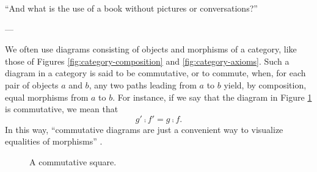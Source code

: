 \epigraph{
  ``And what is the use of a book without pictures or conversations?''
}{---\textcite[13]{carroll-2004}}

\begin{definition}
  \label{def:commutative-diagram}


  We often use diagrams consisting of objects and morphisms of a
  category, like those of Figures \ref{fig:category-composition} and
  \ref{fig:category-axioms}. Such a diagram in a category  is
  said to be commutative, or to commute, when, for each pair of
  objects $a$ and $b$, any two paths leading from $a$ to $b$ yield, by
  composition, equal morphisms from $a$ to $b$. For instance, if we
  say that the diagram in Figure \ref{fig:commutative-square} is
  commutative, we mean that
  \begin{equation*}
    g' \comp f' = g \comp f
    \text{.}
  \end{equation*}
  In this way, ``commutative diagrams are just a convenient way to
  visualize equalities of morphisms'' \parencite[434]{poigne-1992}.

  \begin{figure}[htb]
    \begin{center}
    \end{center}
    \caption{A commutative square.}
    \label{fig:commutative-square}
  \end{figure}

\end{definition}

